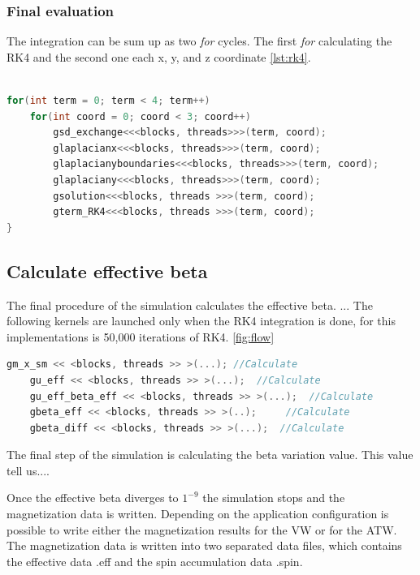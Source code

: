 \subsubsection{Final evaluation}

The integration can be sum up as two \textit{for} cycles. The first \textit{for} calculating the RK4 and the second one each x, y, and z coordinate \ref{lst:rk4}.

\begin{lstlisting}[language=C++, label={lst:rk4}, caption={Summarize of Runge and Kutta 4th Integration}]	

for(int term = 0; term < 4; term++)
	for(int coord = 0; coord < 3; coord++)
    	gsd_exchange<<<blocks, threads>>>(term, coord);
    	glaplacianx<<<blocks, threads>>>(term, coord);
    	glaplacianyboundaries<<<blocks, threads>>>(term, coord);
    	glaplaciany<<<blocks, threads>>>(term, coord);
    	gsolution<<<blocks, threads >>>(term, coord);
    	gterm_RK4<<<blocks, threads >>>(term, coord);
}
\end{lstlisting}


\subsection{Calculate effective beta}

The final procedure of the simulation calculates the effective beta. ... The following kernels are launched only when the RK4 integration is done, for this implementations is 50,000 iterations of RK4. \ref{fig:flow}

\begin{lstlisting}[language=C++, label={lst:beta}, caption={Calculate effective beta}]
    gm_x_sm << <blocks, threads >> >(...); //Calculate
    gu_eff << <blocks, threads >> >(...);  //Calculate 
    gu_eff_beta_eff << <blocks, threads >> >(...); 	//Calculate
    gbeta_eff << <blocks, threads >> >(..); 	//Calculate
    gbeta_diff << <blocks, threads >> >(...);  //Calculate             
\end{lstlisting}


The final step of the simulation is calculating the beta variation value. This value tell us....


Once the effective beta diverges to $1^{-9}$ the simulation stops and the magnetization data is written. Depending on the application configuration is possible to write  either  the magnetization results for the VW or for the ATW. The magnetization data is written into two separated data files, which contains the effective data .eff and the spin accumulation data .spin.

